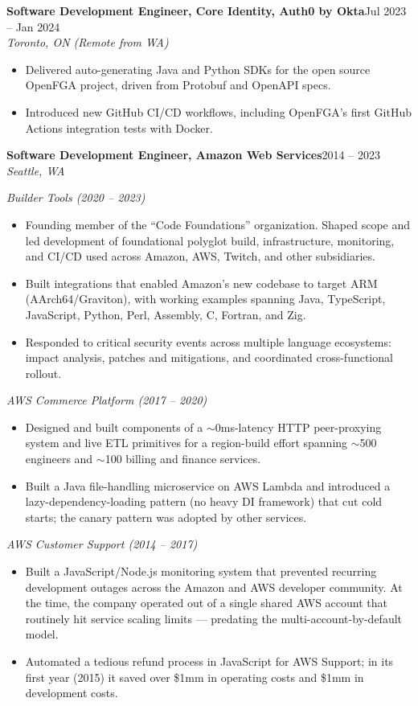 \documentclass[11pt,letterpaper]{article}
\newcommand{\role}[4]{%
  \vspace{0.4em}%
  \noindent\textbf{#1, #2}\hfill{#4}\\
  \textit{#3}\par\vspace{0.05em}%
}
\begin{document}
\role{Software Development Engineer, Core Identity}{Auth0 by Okta}{Toronto, ON (Remote from WA)}{Jul 2023 -- Jan 2024}
\begin{itemize}
  \item Delivered auto-generating Java and Python SDKs for the open source OpenFGA project, driven from Protobuf and OpenAPI specs.
  \item Introduced new GitHub CI/CD workflows, including OpenFGA's first GitHub Actions integration tests with Docker.
\end{itemize}

\role{Software Development Engineer}{Amazon Web Services}{Seattle, WA}{2014 -- 2023}

\textit{Builder Tools (2020 -- 2023)}
\begin{itemize}
  \item Founding member of the ``Code Foundations'' organization. Shaped scope and led development of foundational polyglot build, infrastructure, monitoring, and CI/CD used across Amazon, AWS, Twitch, and other subsidiaries.
  \item Built integrations that enabled Amazon's new codebase to target ARM (AArch64/Graviton), with working examples spanning Java, TypeScript, JavaScript, Python, Perl, Assembly, C, Fortran, and Zig.
  \item Responded to critical security events across multiple language ecosystems: impact analysis, patches and mitigations, and coordinated cross-functional rollout.
\end{itemize}

\textit{AWS Commerce Platform (2017 -- 2020)}
\begin{itemize}
  \item Designed and built components of a $\sim$0ms-latency HTTP peer-proxying system and live ETL primitives for a region-build effort spanning $\sim$500 engineers and $\sim$100 billing and finance services.
  \item Built a Java file-handling microservice on AWS Lambda and introduced a lazy-dependency-loading pattern (no heavy DI framework) that cut cold starts; the canary pattern was adopted by other services.
\end{itemize}

\textit{AWS Customer Support (2014 -- 2017)}
\begin{itemize}
  \item Built a JavaScript/Node.js monitoring system that prevented recurring development outages across the Amazon and AWS developer community. At the time, the company operated out of a single shared AWS account that routinely hit service scaling limits --- predating the multi-account-by-default model.
  \item Automated a tedious refund process in JavaScript for AWS Support; in its first year (2015) it saved over \$1mm in operating costs and \$1mm in development costs.
\end{itemize}
\end{document}
